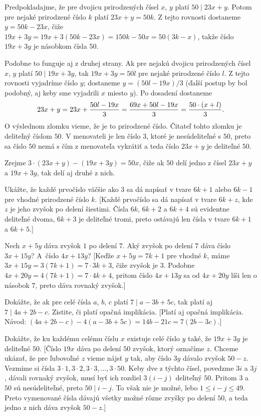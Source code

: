 {%
Predpokladajme, že pre dvojicu prirodzených čísel $x$, $y$ platí $50\mid 23x+y$.
Potom pre nejaké prirodzené číslo $k$ platí $23x+y=50k$.
Z tejto rovnosti dostaneme $y=50k-23x$, čiže $19x+3y=19x+3(50k-23x)=150k-50x=50(3k-x)$,
takže číslo $19x+3y$ je násobkom čísla $50$.

Podobne to funguje aj z druhej strany.
Ak pre nejakú dvojicu prirodzených čísel $x$, $y$ platí $50\mid 19x+3y$,
tak $19x+3y=50l$ pre nejaké prirodzené číslo $l$. Z tejto rovnosti vyjadríme číslo $y$;
dostaneme $y=(50l-19x)/3$ (ďalší postup by bol podobný, aj keby sme vyjadrili $x$ miesto $y$).
Po dosadení dostaneme
$$
23x+y = 23x + {50l-19x\over 3} = {69x + 50l - 19x\over 3} = {50\cdot (x+l)\over 3}.
$$
O výslednom zlomku vieme, že je to prirodzené číslo. Čitateľ tohto zlomku je deliteľný číslom $50$.
V menovateli je len číslo $3$, ktoré je nesúdeliteľné s $50$, preto sa číslo $50$ nemá s čím z menovateľa vykrátiť
a teda číslo $23x+y$ je deliteľné $50$.

\ineriesenie
Zrejme $3\cdot (23x+y)-(19x+3y)=50x$, čiže ak $50$ delí jedno z čísel $23x+y$ a $19x+3y$, tak delí aj druhé z nich.

Ukážte, že každé prvočíslo väčšie ako $3$ sa dá napísať v tvare $6k+1$ alebo $6k-1$ pre vhodné prirodzené číslo $k$.
[Každé prvočíslo sa dá napísať v tvare $6k+z$, kde $z$ je jeho zvyšok po delení šiestimi.
Čísla $6k$, $6k+2$ a $6k+4$ sú evidentne deliteľné dvoma, $6k+3$ je deliteľné tromi, preto ostávajú len
čísla v tvare $6k+1$ a $6k+5$.]

Nech $x + 5y$ dáva zvyšok $1$ po delení $7$. Aký zvyšok po delení $7$ dáva číslo $3x+15y$? A~číslo $4x+13y$?
[Keďže $x+5y=7k+1$ pre vhodné $k$, máme $3x+15y = 3(7k+1) = 7\cdot 3k + 3$, čiže zvyšok je $3$.
Podobne $4x+20y=4(7k+1)=7\cdot 4k+4$, pritom číslo $4x+13y$ sa od $4x+20y$ líši len o násobok $7$, preto dáva rovnaký zvyšok.]

\D
Dokážte, že ak pre celé čísla $a$, $b$, $c$ platí $7\mid a-3b+5c$, tak platí aj $7\mid 4a+2b-c$.
Zistite, či platí opačná implikácia.
[Platí aj opačná implikácia. Návod: $(4a+2b-c)-4(a-3b+5c)=14b-21c=7(2b-3c)$.]

Dokážte, že ku každému celému číslu $x$ existuje celé číslo $y$ také, že $19x+3y$ je deliteľné $50$.
[Číslo $19x$ dáva po delení $50$ zvyšok, ktorý označíme $z$. Chceme ukázať, že pre ľubovoľné $z$
vieme nájsť $y$ tak, aby číslo $3y$ dávalo zvyšok $50-z$. Vezmime si čísla $3\cdot 1, 3\cdot 2, 3\cdot 3,\dots,
3\cdot 50$. Keby dve z týchto čísel, povedzme $3i$ a $3j$, dávali rovnaký zvyšok, musí byť ich rozdiel $3(i-j)$
deliteľný $50$. Pritom $3$ a $50$ sú nesúdeliteľné, preto $50\mid i-j$. To však nie je možné, lebo $1\le i-j\le 49$.
Preto vymenované čísla dávajú všetky možné rôzne zvyšky po delení $50$, a teda jedno z nich dáva zvyšok $50-z$.]
}

